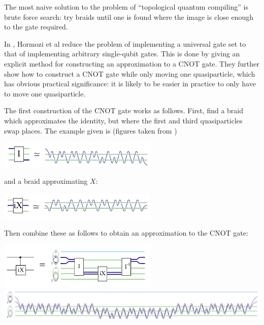The most naive solution to the problem of ``topological quantum
compiling'' is brute force search: try braids until one is found where the
image is close enough to the gate required.

In \cite{Hormozi2007}, Hormozi et al reduce the problem of implementing a
universal gate set to that of implementing arbitrary single-qubit gates.
This is done by giving an explicit method for constructing an approximation to
a CNOT gate. They further show how to construct a CNOT gate while only moving
one quasiparticle, which has obvious practical significance: it is likely to be
easier in practice to only have to move one quasiparticle.

The first construction of the CNOT gate works as follows. First, find a braid
which approximates the identity, but where the first and third quasiparticles
swap places. The example given is (figures taken from \cite{Hormozi2007})

\begin{center}
\includegraphics[width=3in]{I-small.png}
\end{center}

and a braid approximating $X$:


\begin{center}
\includegraphics[width=3in]{X-small.png}
\end{center}

Then combine these as follows to obtain an approximation to the CNOT gate:

\begin{center}
\includegraphics[width=3in]{CNOT-small.png} \\
\includegraphics[width=6in]{CNOT-large.png}
\end{center}

